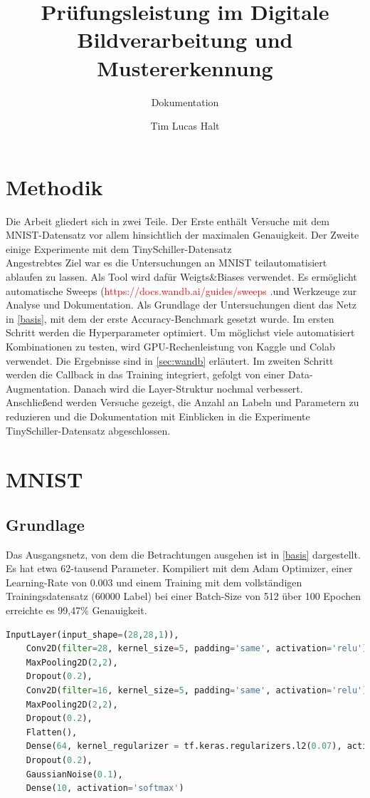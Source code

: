 \documentclass[
fontsize=12pt,					%
paper=a4,						%
twoside=true, 					%
listof=totoc, 					%
bibliography=totoc,				%
titlepage, 						%
headsepline, 					%
DIV=12,							%
BCOR=6mm,						%
cleardoublepage=empty,			%
parskip,							%
ngerman
]{scrartcl}
\title{Prüfungsleistung im \glqq Digitale Bildverarbeitung und Mustererkennung\grqq}
\subtitle{Dokumentation}
\author{Tim Lucas Halt}
\begin{document}
\maketitle

\section{Methodik}

Die Arbeit gliedert sich in zwei Teile. Der Erste enthält Versuche mit dem MNIST-Datensatz vor allem hinsichtlich der maximalen Genauigkeit. Der Zweite einige Experimente mit dem TinySchiller-Datensatz\\
Angestrebtes Ziel war es die Untersuchungen an MNIST teilautomatisiert ablaufen zu lassen. Als Tool wird dafür Weigts\&Biases verwendet. Es ermöglicht automatische Sweeps  (\textcolor{red}{https://docs.wandb.ai/guides/sweeps} .und Werkzeuge zur Analyse und Dokumentation. Als Grundlage der Untersuchungen dient das Netz in \autoref{basis}, mit dem der erste Accuracy-Benchmark gesetzt wurde. Im ersten Schritt werden die Hyperparameter optimiert. Um möglichst viele automatisiert Kombinationen zu testen, wird GPU-Rechenleistung von Kaggle und Colab verwendet. Die Ergebnisse sind in \autoref{sec:wandb} erläutert. Im zweiten Schritt werden die Callback in das Training integriert, gefolgt von einer Data-Augmentation. Danach wird die Layer-Struktur nochmal verbessert.\\
Anschließend werden Versuche gezeigt, die Anzahl an Labeln und Parametern zu reduzieren und die Dokumentation mit Einblicken in die Experimente TinySchiller-Datensatz abgeschlossen.

\section{MNIST}

\subsection{Grundlage}
\label{sec:basis}

Das Ausgangsnetz, von dem die Betrachtungen ausgehen ist in \autoref{basis} dargestellt. Es hat etwa 62-tausend Parameter. Kompiliert mit dem Adam Optimizer, einer Learning-Rate von 0.003 und einem Training mit dem vollständigen Trainingsdatensatz (60000 Label) bei einer Batch-Size von 512 über 100 Epochen erreichte es 99,47\% Genauigkeit.

\begin{lstlisting}[language=Python, caption=Grundlagen-Netz, label=basis]
	InputLayer(input_shape=(28,28,1)),
	Conv2D(filter=28, kernel_size=5, padding='same', activation='relu'),
	MaxPooling2D(2,2),
	Dropout(0.2),
	Conv2D(filter=16, kernel_size=5, padding='same', activation='relu'),
	MaxPooling2D(2,2),
	Dropout(0.2),
	Flatten(),
	Dense(64, kernel_regularizer = tf.keras.regularizers.l2(0.07), activation = 'relu'),
	Dropout(0.2),
	GaussianNoise(0.1),
	Dense(10, activation='softmax')
\end{lstlisting}
\end{document}
